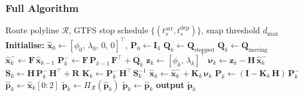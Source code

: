 \documentclass[12pt, a4paper]{article}
\begin{document}
\subsubsection{Full Algorithm}

\begin{algorithm}[H]
\caption{Map-Matched Kalman Filter with Scheduled Stop Detection (MM-KF)}
\label{alg:mm_kf}
\begin{algorithmic}[1]
\Require Route polyline $\mathcal{R}$, GTFS stop schedule
         $\{(t^{\text{arr}}_s, t^{\text{dep}}_s)\}$,
         snap threshold $d_{\max}$
\State \textbf{Initialise:} $\hat{\mathbf{x}}_0 \leftarrow
       [\phi_0,\,\lambda_0,\,0,\,0]^\top$,\;
       $\mathbf{P}_0 \leftarrow \mathbf{I}_4$
    \State {}
        \State $\mathbf{Q}_k \leftarrow \mathbf{Q}_{\text{stopped}}$
    \Else
        \State $\mathbf{Q}_k \leftarrow \mathbf{Q}_{\text{moving}}$
    \EndIf
    \State {}
    \State $\hat{\mathbf{x}}^-_k \leftarrow \mathbf{F}\,\hat{\mathbf{x}}_{k-1}$
    \State $\mathbf{P}^-_k \leftarrow \mathbf{F}\,\mathbf{P}_{k-1}\,\mathbf{F}^\top
           + \mathbf{Q}_k$
    \State {}
    \State $\mathbf{z}_k \leftarrow [\phi_k,\,\lambda_k]^\top$
    \State $\boldsymbol{\nu}_k \leftarrow \mathbf{z}_k - \mathbf{H}\,\hat{\mathbf{x}}^-_k$
    \State $\mathbf{S}_k \leftarrow \mathbf{H}\,\mathbf{P}^-_k\,\mathbf{H}^\top + \mathbf{R}$
    \State $\mathbf{K}_k \leftarrow \mathbf{P}^-_k\,\mathbf{H}^\top\,\mathbf{S}_k^{-1}$
    \State $\hat{\mathbf{x}}_k \leftarrow \hat{\mathbf{x}}^-_k +
           \mathbf{K}_k\,\boldsymbol{\nu}_k$
    \State $\mathbf{P}_k \leftarrow
           (\mathbf{I} - \mathbf{K}_k\,\mathbf{H})\,\mathbf{P}^-_k$
    \State {}
    \State $\hat{\mathbf{p}}_k \leftarrow \hat{\mathbf{x}}_k[0:2]$
        \State $\tilde{\mathbf{p}}_k \leftarrow \Pi_{\mathcal{R}}(\hat{\mathbf{p}}_k)$
    \Else
        \State $\tilde{\mathbf{p}}_k \leftarrow \hat{\mathbf{p}}_k$
    \EndIf
    \State \textbf{output} $\tilde{\mathbf{p}}_k$ 
\EndFor
\end{algorithmic}
\end{algorithm}
\end{document}
